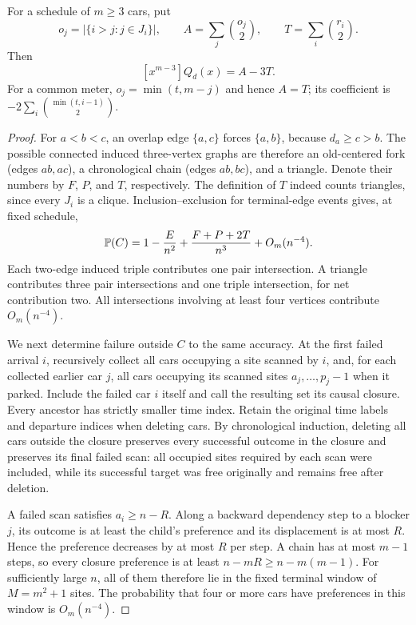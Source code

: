 \documentclass[11pt,a4paper]{article}
\begin{document}
\begin{corollary}\label{cor:third}
For a schedule of $m\ge3$ cars, put
\[
 o_j=|\{i>j:j\in J_i\}|,\qquad
 A=\sum_j\binom{o_j}{2},\qquad T=\sum_i\binom{r_i}{2}.
\]
Then
\[
 [x^{m-3}]Q_d(x)=A-3T.
\]
For a common meter, $o_j=\min(t,m-j)$ and hence $A=T$; its coefficient
is $-2\sum_i\binom{\min(t,i-1)}2$.
\end{corollary}

\begin{proof}
For $a<b<c$, an overlap edge $\{a,c\}$ forces $\{a,b\}$, because
$d_a\ge c>b$. The possible connected induced three-vertex graphs
are therefore an old-centered fork (edges $ab,ac$), a chronological
chain (edges $ab,bc$), and a triangle. Denote their numbers by $F$,
$P$, and $T$, respectively. The definition of $T$ indeed counts
triangles, since every $J_i$ is a clique. Inclusion--exclusion for
terminal-edge events gives, at fixed schedule,
\[
 \mathbb P(C)=1-\frac E{n^2}
                 +\frac{F+P+2T}{n^3}+O_m(n^{-4}).
\]
Each two-edge induced triple contributes one pair intersection. A
triangle contributes three pair intersections and one triple
intersection, for net contribution two. All intersections involving
at least four vertices contribute $O_m(n^{-4})$.

We next determine failure outside $C$ to the same accuracy. At the
first failed arrival $i$, recursively collect all cars occupying a
site scanned by $i$, and, for each collected earlier car $j$, all
cars occupying its scanned sites $a_j,\ldots,p_j-1$ when it parked.
Include the failed car $i$ itself and call the resulting set its causal closure. Every ancestor has
strictly smaller time index. Retain the original time labels and
departure indices when deleting cars. By chronological induction,
deleting all cars outside the closure preserves every successful outcome in
the closure and preserves its final failed scan: all occupied sites
required by each scan were included, while its successful target
was free originally and remains free after deletion.

A failed scan satisfies $a_i\ge n-R$. Along a backward dependency
step to a blocker $j$, its outcome is at least the child's
preference and its displacement is at most $R$. Hence the preference
decreases by at most $R$ per step. A chain has at most $m-1$ steps,
so every closure preference is at least $n-mR\ge n-m(m-1)$.
For sufficiently large $n$, all of them therefore lie in the fixed
terminal window of $M=m^2+1$ sites. The probability that four or more
cars have preferences in this window is $O_m(n^{-4})$.


\end{proof}
\end{document}
